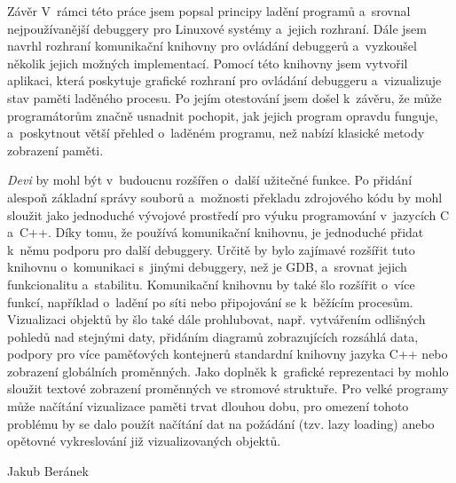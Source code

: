 \documentclass[czech,bachelor,male,python,dept460,hidelinks]{diploma}						%
\newcommand{\parspace}[1][]{
	\ifthenelse{\isempty{#1}}{\vspace{0mm}}{\vspace{#1}}
	\par
}
\begin{document}
\begin{section}{Závěr}
\label{sec:Conclusion}
	V~rámci této práce jsem popsal principy ladění programů a~srovnal nejpoužívanější debuggery pro Linuxové systémy a~jejich rozhraní. Dále jsem
	navrhl rozhraní komunikační knihovny pro ovládání debuggerů a~vyzkoušel několik jejich možných implementací. Pomocí této knihovny jsem
	vytvořil aplikaci, která poskytuje grafické rozhraní pro ovládání debuggeru a~vizualizuje stav paměti laděného procesu. Po jejím otestování jsem
	došel k~závěru, že může programátorům značně usnadnit pochopit, jak jejich program opravdu funguje, a~poskytnout větší přehled o~laděném programu, než
	nabízí klasické metody zobrazení paměti.

	\parspace \textit{Devi} by mohl být v~budoucnu rozšířen o~další užitečné funkce. Po přidání alespoň základní správy souborů a~možnosti překladu
	zdrojového kódu by mohl sloužit jako jednoduché vývojové prostředí pro výuku programování v~jazycích C a~C++.
	Díky tomu, že používá komunikační knihovnu, je jednoduché přidat k~němu podporu pro další debuggery. Určitě by bylo
	zajímavé rozšířit tuto knihovnu o~komunikaci s~jinými debuggery, než je GDB, a~srovnat jejich funkcionalitu a~stabilitu.
	Komunikační knihovnu by také šlo rozšířit o~více funkcí, například o~ladění po síti nebo připojování se k~běžícím procesům.
	Vizualizaci objektů by šlo také dále prohlubovat, např. vytvářením odlišných pohledů nad stejnými daty, přidáním diagramů zobrazujících rozsáhlá data,
	podpory pro více paměťových kontejnerů standardní knihovny jazyka C++ nebo zobrazení globálních proměnných.
	Jako doplněk k~grafické reprezentaci by mohlo sloužit textové zobrazení proměnných ve stromové struktuře.
	Pro velké programy může načítání vizualizace paměti trvat dlouhou dobu, pro omezení tohoto problému by se dalo použít načítání dat na požádání
	(tzv. lazy loading) anebo opětovné vykreslování již vizualizovaných objektů.
\end{section}

\bigskip
\begin{flushright}
Jakub Beránek
\end{flushright}

\printbibheading[title=Literatura, heading=bibintoc]
\printbibliography[heading=none]
\end{document}
